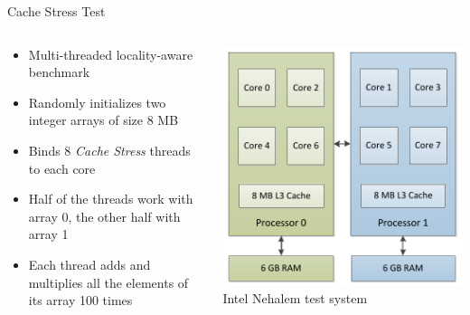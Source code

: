 \begin{frame}{Cache Stress Test}
  \begin{columns}[c]
    \begin{column}{0.47\textwidth}
      \begin{itemize}
      \item Multi-threaded locality-aware benchmark
      \item Randomly initializes two integer arrays of size 8 MB
      \item Binds 8 \emph{Cache Stress} threads to each core
      \item Half of the threads work with array 0, the other half with
        array 1
      \item Each thread adds and multiplies all the elements of its
        array 100 times
      \end{itemize}
    \end{column}
    \begin{column}{0.53\textwidth}
      \begin{center}
        \includegraphics[width=\textwidth]{figures/mafushi} \\
        \tiny{Intel Nehalem test system}
      \end{center}
    \end{column}
  \end{columns}
\end{frame}

